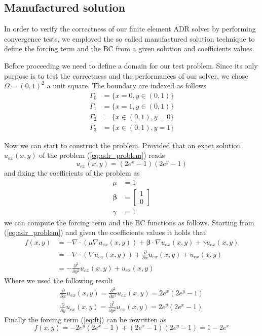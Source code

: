\documentclass{article}
\begin{document}
\subsection{Manufactured solution}
In order to verify the correctness of our finite element ADR solver by performing convergence tests, we employed the so called manufactured solution technique to define the forcing term and the BC from a given solution and coefficients values.

Before proceeding we need to define a domain for our test problem. Since its only purpose is to test the correctness and the performances of our solver, we chose $\Omega = (0,1)^2$ a unit square. The boundary are indexed as follows
\begin{align*}
    \Gamma_0 &= \{x=0,y\in (0,1)\} \\
    \Gamma_1 &= \{x=1,y\in (0,1)\} \\
    \Gamma_2 &= \{x\in (0,1),y=0\} \\
    \Gamma_3 &= \{x\in (0,1),y=1\}
\end{align*}

Now we can start to construct the problem. Provided that an exact solution $u_{ex}(x,y)$ of the problem (\ref{eq:adr_problem}) reads
\begin{equation}\label{eq:exact}
    u_{ex}(x,y) = (2e^x - 1)(2e^y - 1)
\end{equation}
and fixing the coefficients of the problem as
\begin{align}
    \mu &= 1 \\
    \boldsymbol{\beta} &= \begin{bmatrix}1\\0\end{bmatrix} \\
    \gamma &= 1
\end{align}
we can compute the forcing term and the BC functions as follows.
Starting from (\ref{eq:adr_problem}) and given the coefficients values it holds that
\begin{equation}
\begin{split}\label{eq:ft}
    f(x,y) &= -\nabla \cdot (\mu \nabla u_{ex}(x,y)) + \boldsymbol{\beta} \cdot \nabla u_{ex}(x,y) + \gamma u_{ex}(x,y) \\
           &= -\nabla \cdot (\nabla u_{ex}(x,y)) + \frac{\partial}{\partial x}u_{ex}(x,y) + u_{ex}(x,y) \\
           &= - \frac{\partial^2}{\partial y^2}u_{ex}(x,y) + u_{ex}(x,y)
\end{split}
\end{equation}
Where we used the following result
\begin{align}
    \frac{\partial}{\partial x}u_{ex}(x,y) = \frac{\partial^2}{\partial x^2}u_{ex}(x,y) = 2e^x(2e^y - 1) \\
    \frac{\partial}{\partial y}u_{ex}(x,y) = \frac{\partial^2}{\partial y^2}u_{ex}(x,y) = 2e^y(2e^x - 1)
\end{align}
Finally the forcing term (\ref{eq:ft}) can be rewritten as
\begin{equation}
    f(x,y) = - 2e^y(2e^x - 1) + (2e^x - 1)(2e^y - 1) = 1-2e^x
\end{equation}
\end{document}
